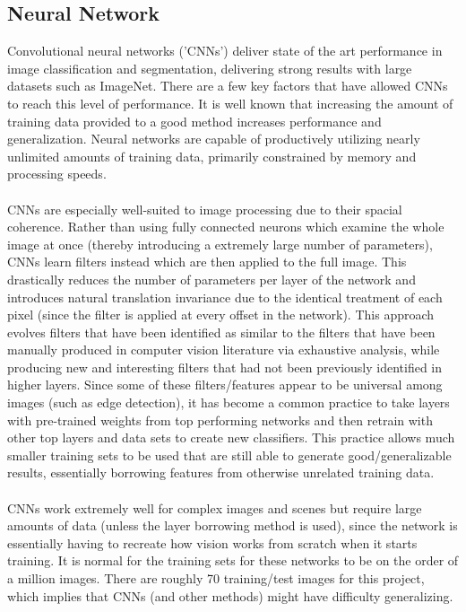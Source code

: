 \documentclass[12pt]{article}
\begin{document}
\subsection{Neural Network}
Convolutional neural networks ('CNNs') deliver state of the art performance in image classification and segmentation, delivering strong results with large datasets such as ImageNet.  There are a few key factors that have allowed CNNs to reach this level of performance.  It is well known that increasing the amount of training data provided to a good method increases performance and generalization.  Neural networks are capable of productively utilizing nearly unlimited amounts of training data, primarily constrained by memory and processing speeds.\\
\\
CNNs are especially well-suited to image processing due to their spacial coherence.  Rather than using fully connected neurons which examine the whole image at once (thereby introducing a extremely large number of parameters), CNNs learn filters instead which are then applied to the full image.  This drastically reduces the number of parameters per layer of the network and introduces natural translation invariance due to the identical treatment of each pixel (since the filter is applied at every offset in the network).  This approach evolves filters that have been identified as similar to the filters that have been manually produced in computer vision literature via exhaustive analysis, while producing new and interesting filters that had not been previously identified in higher layers.  Since some of these filters/features appear to be universal among images (such as edge detection), it has become a common practice to take layers with pre-trained weights from top performing networks and then retrain with other top layers and data sets to create new classifiers.  This practice allows much smaller training sets to be used that are still able to generate good/generalizable results, essentially borrowing features from otherwise unrelated training data.\\
\\
CNNs work extremely well for complex images and scenes but require large amounts of data (unless the layer borrowing method is used), since the network is essentially having to recreate how vision works from scratch when it starts training.  It is normal for the training sets for these networks to be on the order of a million images.  There are roughly 70 training/test images for this project, which implies that CNNs (and other methods) might have difficulty generalizing.\\
\end{document}
